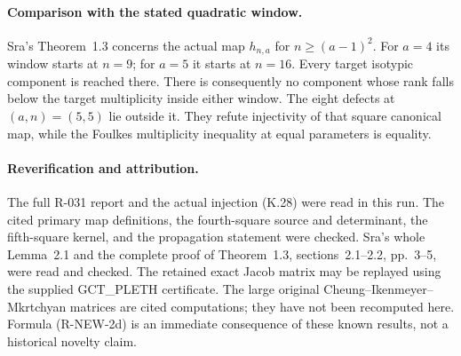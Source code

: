 \paragraph{Comparison with the stated quadratic window.}
Sra's Theorem~1.3 concerns the actual map $h_{n,a}$ for
$n\ge(a-1)^2$. For $a=4$ its window starts at $n=9$;
for $a=5$ it starts at $n=16$. Every target isotypic component
is reached there. There is consequently no component whose rank
falls below the target multiplicity inside either window.
The eight defects at $(a,n)=(5,5)$ lie outside it. They refute
injectivity of that square canonical map, while the Foulkes
multiplicity inequality at equal parameters is equality.

\paragraph{Reverification and attribution.}
The full R-031 report and the actual injection (K.28) were read in
this run. The cited primary map definitions, the fourth-square
source and determinant, the fifth-square kernel, and the propagation
statement were checked. Sra's whole Lemma~2.1 and the complete proof
of Theorem~1.3, sections~2.1--2.2, pp.~3--5, were read and checked.
The retained exact Jacob matrix may be replayed using the supplied
GCT\_PLETH certificate. The large original Cheung--Ikenmeyer--
Mkrtchyan matrices are cited computations; they have not been
recomputed here. Formula (R-NEW-2d) is an immediate consequence
of these known results, not a historical novelty claim.

